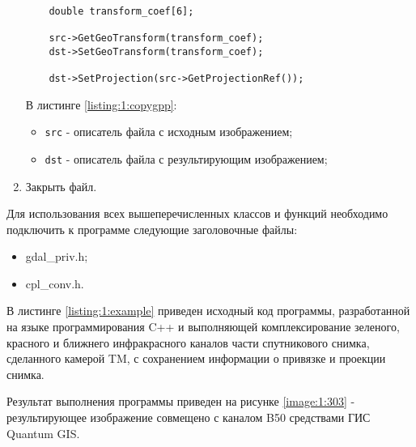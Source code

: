 \begin{enumerate}
	\begin{lstlisting}

	double transform_coef[6];

	src->GetGeoTransform(transform_coef);
	dst->SetGeoTransform(transform_coef);

	dst->SetProjection(src->GetProjectionRef());

	\end{lstlisting}
	\mylistingend

	В листинге \ref{listing:1:copygpp}:

	\begin{itemize}

		\item \verb|src| - описатель файла с исходным изображением;
		\item \verb|dst| - описатель файла с результирующим изображением;

	\end{itemize}

	\item Закрыть файл.

\end{enumerate}

Для использования всех вышеперечисленных классов и функций необходимо подключить к программе следующие заголовочные файлы:

\begin{itemize}

	\item gdal\_priv.h;
	\item cpl\_conv.h.

\end{itemize}


В листинге \ref{listing:1:example} приведен исходный код программы, разработанной на языке программирования C++ и выполняющей комплексирование зеленого, красного и ближнего инфракрасного каналов части спутникового снимка, сделанного камерой TM, с сохранением информации о привязке и проекции снимка.

Результат выполнения программы приведен на рисунке \ref{image:1:303} - результирующее изображение совмещено с каналом B50 средствами ГИС Quantum GIS.


\begin{landscape}
\end{landscape}

